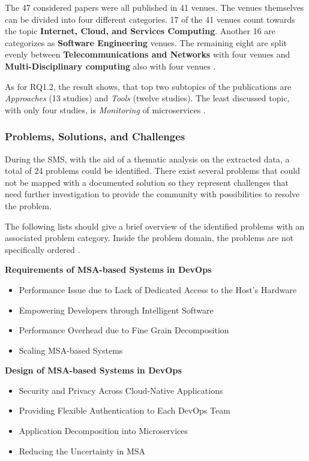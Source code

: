 The 47 considered papers were all published in 41 venues. The venues
themselves can be divided into four different categories. 17 of the 41
venues count towards the topic \textbf{Internet, Cloud, and Services Computing}.
Another 16 are categorizes as \textbf{Software Engineering} venues. The remaining
eight are split evenly between \textbf{Telecommunications and Networks} with four venues
and \textbf{Multi-Disciplinary computing} also with four venues \cite{waseem:SMSMSADevOps}.

As for RQ1.2, the result shows, that top two subtopics of the publications
are \textit{Approaches} (13 studies) and \textit{Tools} (twelve studies).
The least discussed topic, with only four studies, is \textit{Monitoring}
of microservices \cite{waseem:SMSMSADevOps}.

\subsubsection{Problems, Solutions, and Challenges}

During the SMS, with the aid of a thematic analysis on the
extracted data, a total of 24 problems could be identified.
There exist several problems that could not be mapped with a documented
solution so they represent challenges that need further investigation
to provide the community with possibilities to resolve the problem.

The following lists should give a brief overview of the identified
problems with an associated problem category. Inside the problem domain,
the problems are not specifically ordered \cite{waseem:SMSMSADevOps}.

\textbf{Requirements of MSA-based Systems in DevOps}
\begin{itemize}
    \item Performance Issue due to Lack of Dedicated Access
    to the Host's Hardware
    \item Empowering Developers through Intelligent Software
    \item Performance Overhead due to Fine Grain Decomposition
    \item Scaling MSA-based Systems
\end{itemize}

\textbf{Design of MSA-based Systems in DevOps}
\begin{itemize}
    \item Security and Privacy Across Cloud-Native Applications
    \item Providing Flexible Authentication to Each DevOps Team
    \item Application Decomposition into Microservices
    \item Reducing the Uncertainty in MSA
\end{itemize}

